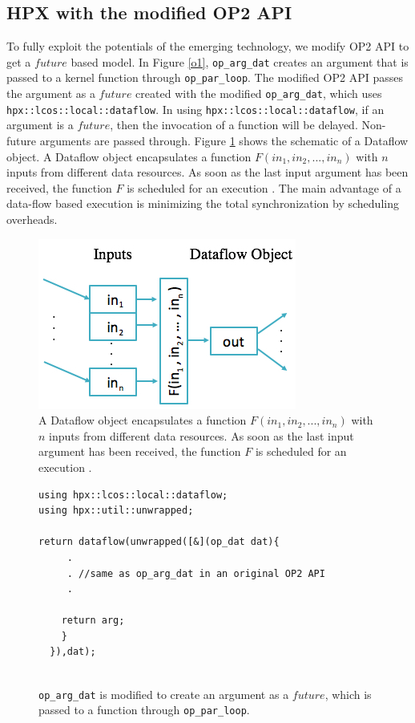 \documentclass[conference]{IEEEtran}
\begin{document}
\subsection{\textbf{HPX with the modified OP2 API}}
\label{sec:with}

To fully exploit the potentials of the emerging technology, we modify OP2 API to get a $future$ based model. In Figure \ref{o1}, \texttt{op\_arg\_dat} creates an argument that is passed to a kernel function through \texttt{op\_par\_loop}. The modified OP2 API passes the argument as a $future$ created with the modified \texttt{op\_arg\_dat}, which uses \texttt{hpx::lcos::local::dataflow}. In using \texttt{hpx::lcos::local::dataflow}, if an argument is a $future$, then the invocation of a function will be delayed. Non-future arguments are passed through. Figure \ref{o3} shows the schematic of a Dataflow object. A  Dataflow object encapsulates a function $F(in_1,in_2,...,in_n)$ with $n$ inputs from different data resources. As soon as the last input argument has been received, the function $F$ is scheduled for an execution \cite{r7}. The main advantage of a data-flow based execution is minimizing the total synchronization by scheduling overheads. 


\begin{figure} 
\begin{center}
\centering
\includegraphics[width=0.65\columnwidth]{Pictures/tree.jpg}
\caption {A Dataflow object encapsulates a function $F(in_1,in_2,...,in_n)$ with $n$ inputs from different data resources. As soon as the last input argument has been received, the function $F$ is scheduled for an execution \cite{r7}.}
\label{o3}
\end{center}
\end{figure}

\begin{figure} 
    \begin{lstlisting}    
using hpx::lcos::local::dataflow;
using hpx::util::unwrapped;    

return dataflow(unwrapped([&](op_dat dat){
     .
     . //same as op_arg_dat in an original OP2 API
     .

    return arg;
    }
  }),dat);
  
    \end{lstlisting}
    \caption{\small{\texttt{op\_arg\_dat} is modified to create an argument as a $future$, which is passed to a function through \texttt{op\_par\_loop}.}}
    \label{o2}
\end{figure}
\end{document}

